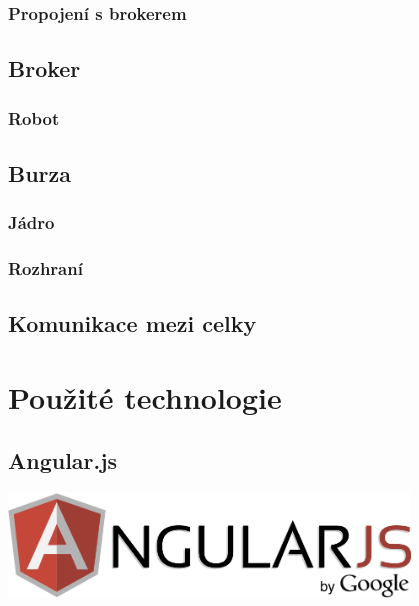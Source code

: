 \documentclass[thesis=M,czech]{FITthesis}[2012/06/26]
\begin{document}
\subsubsection{Propojení s brokerem}

\subsection{Broker}
\subsubsection{Robot}

\subsection{Burza}
\subsubsection{Jádro}
\subsubsection{Rozhraní}

\subsection{Komunikace mezi celky}

\section{Použité technologie}

\subsection{Angular.js}
\includegraphics[width=0.8\textwidth]{images/logo_angularjs}
\end{document}

